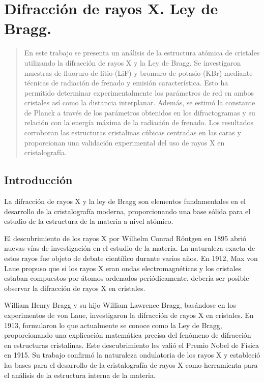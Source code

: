 \chapter{Difracción de rayos X. Ley de Bragg.}
\begin{abstract}
	\vspace{0.2cm}
	\footnotesize En este trabajo se presenta un análisis de la estructura atómica de cristales utilizando la difracción de rayos X y la Ley de Bragg. Se investigaron muestras de fluoruro de litio (LiF) y bromuro de potasio (KBr) mediante técnicas de radiación de frenado y emisión característica. Esto ha permitido determinar experimentalmente los parámetros de red en ambos cristales así como la distancia interplanar.  Además, se estimó la constante de Planck a través de los parámetros obtenidos en los difractogramas y su relación con la energía máxima de la radiación de frenado. Los resultados corroboran las estructuras cristalinas cúbicas centradas en las caras y proporcionan una validación experimental del uso de rayos X en cristalografía.
	
\end{abstract}
\section{Introducción}

\vspace{\baselineskip}

La difracción de rayos X y la ley de Bragg son elementos fundamentales en el desarrollo de la cristalografía moderna, proporcionando una base sólida para el estudio de la estructura de la materia a nivel atómico.

\vspace{\baselineskip}

El descubrimiento de los rayos X por Wilhelm Conrad Röntgen en 1895 abrió nuevas vías de investigación en el estudio de la materia. La naturaleza exacta de estos rayos fue objeto de debate científico durante varios años. En 1912, Max von Laue propuso que si los rayos X eran ondas electromagnéticas y los cristales estaban compuestos por átomos ordenados periódicamente, debería ser posible observar la difracción de rayos X en cristales.

\vspace{\baselineskip}

William Henry Bragg y su hijo William Lawrence Bragg, basándose en los experimentos de von Laue, investigaron la difracción de rayos X en cristales. En 1913, formularon lo que actualmente se conoce como la Ley de Bragg, proporcionando una explicación matemática precisa del fenómeno de difracción en estructuras cristalinas. Este descubrimiento les valió el Premio Nobel de Física en 1915. Su trabajo confirmó la naturaleza ondulatoria de los rayos X y estableció las bases para el desarrollo de la cristalografía de rayos X como herramienta para el análisis de la estructura interna de la materia.


